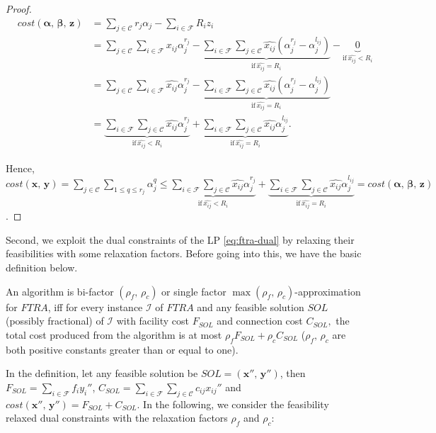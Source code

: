 \documentclass[10pt]{llncs}
\begin{document}
\begin{proof}
{\small 
\begin{eqnarray*}
 & cost\left(\boldsymbol{\alpha},\,\boldsymbol{\beta},\,\boldsymbol{z}\right) & =\sum_{j\in\mathcal{C}}r_{j}\alpha_{j}-\sum_{i\in\mathcal{F}}R_{i}z_{i}\\
 &  & =\sum_{j\in\mathcal{C}}\sum_{i\in\mathcal{F}}x_{ij}\alpha_{j}^{r_{j}}-\underset{\textrm{if}\,\hat{x_{ij}}=R_{i}}{\underbrace{\sum_{i\in\mathcal{F}}\sum_{j\in\mathcal{C}}\hat{x_{ij}}\left(\alpha_{j}^{r_{j}}-\alpha_{j}^{l_{ij}}\right)}}-\underset{\textrm{if}\,\hat{x_{ij}}<R_{i}}{\underbrace{0}}\\
 &  & =\sum_{j\in\mathcal{C}}\sum_{i\in\mathcal{F}}\hat{x_{ij}}\alpha_{j}^{r_{j}}-\underset{\textrm{if}\,\hat{x_{ij}}=R_{i}}{\underbrace{\sum_{i\in\mathcal{F}}\sum_{j\in\mathcal{C}}\hat{x_{ij}}\left(\alpha_{j}^{r_{j}}-\alpha_{j}^{l_{ij}}\right)}}\\
 &  & =\underset{\textrm{if}\,\hat{x_{ij}}<R_{i}}{\underbrace{\sum_{i\in\mathcal{F}}\sum_{j\in\mathcal{C}}\hat{x_{ij}}\alpha_{j}^{r_{j}}}}+\underset{\textrm{if}\,\hat{x_{ij}}=R_{i}}{\underbrace{\sum_{i\in\mathcal{F}}\sum_{j\in\mathcal{C}}\hat{x_{ij}}\alpha_{j}^{l_{ij}}}}.
\end{eqnarray*}
}{\small \par}

Hence, $cost\left(\boldsymbol{x},\,\boldsymbol{y}\right)=\sum_{j\in\mathcal{C}}\sum_{1\leq q\leq r_{j}}\alpha_{j}^{q}\leq\underset{\textrm{if}\,\hat{x_{ij}}<R_{i}}{\underbrace{\sum_{i\in\mathcal{F}}\sum_{j\in\mathcal{C}}\hat{x_{ij}}\alpha_{j}^{r_{j}}}}+\underset{\textrm{if}\,\hat{x_{ij}}=R_{i}}{\underbrace{\sum_{i\in\mathcal{F}}\sum_{j\in\mathcal{C}}\hat{x_{ij}}\alpha_{j}^{l_{ij}}}}=cost\left(\boldsymbol{\alpha},\,\boldsymbol{\beta},\,\boldsymbol{z}\right)$.
\end{proof}
Second, we exploit the dual constraints of the LP \eqref{eq:ftra-dual}
by relaxing their feasibilities with some relaxation factors. Before
going into this, we have the basic definition below.
\begin{definition}
An algorithm is bi-factor $\left(\rho_{f},\,\rho_{c}\right)$ or single
factor $\max\left(\rho_{f},\,\rho_{c}\right)$-approximation for $FTRA$,
iff for every instance $\mathcal{I}$ of $FTRA$ and any feasible
solution $SOL$ (possibly fractional) of $\mathcal{I}$ with facility
cost $F_{SOL}$ and connection cost $C_{SOL},$ the total cost produced
from the algorithm is at most $\rho_{f}F_{SOL}+\rho_{c}C_{SOL}$ ($\rho_{f},\,\rho_{c}$
are both positive constants greater than or equal to one).
\end{definition}
In the definition, let any feasible solution be $SOL=\left(\boldsymbol{x''},\,\boldsymbol{y''}\right)$,
then $F_{SOL}=\sum_{i\in\mathcal{F}}f_{i}y_{i}''$, $C_{SOL}=\sum_{i\in\mathcal{F}}\sum_{j\in\mathcal{C}}c_{ij}x_{ij}''$
and $cost\left(\boldsymbol{x''},\,\boldsymbol{y''}\right)=F_{SOL}+C_{SOL}$.
In the following, we consider the feasibility relaxed dual constraints
with the relaxation factors $\rho_{f}$ and $\rho_{c}$:
\end{document}
